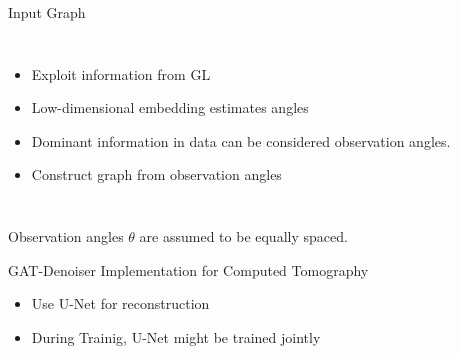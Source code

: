 \begin{frame}{Input Graph}
  \pause
  \begin{columns}
    \begin{itemize}
      \item Exploit information from GL
      \item Low-dimensional embedding estimates angles
      \item Dominant information in data can be considered observation angles.
      \item<3-> \alert<3>{Construct graph from observation angles}
    \end{itemize}


    
  \end{columns}
  

  \begin{tcolorbox}[colback=red!5!white,hide=<1-4>, alert=<5>, colframe=red!75!black]
    Observation angles  $\theta$ are assumed to be equally spaced.
\end{tcolorbox}
\end{frame}


\begin{frame}{GAT-Denoiser Implementation for Computed Tomography}
  \begin{itemize}
    \item Use U-Net for reconstruction
    \item During Trainig, U-Net might be trained jointly
  \end{itemize}
\end{frame}

